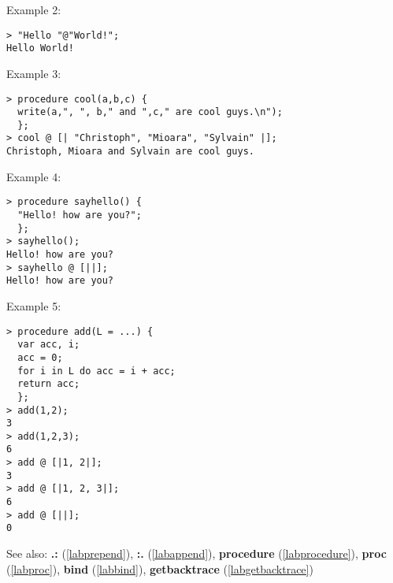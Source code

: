 \noindent Example 2: 
\begin{center}\begin{minipage}{15cm}\begin{Verbatim}[frame=single,commandchars=\\\|\~]
> "Hello "@"World!";
Hello World!
\end{Verbatim}
\end{minipage}\end{center}
\noindent Example 3: 
\begin{center}\begin{minipage}{15cm}\begin{Verbatim}[frame=single,commandchars=\\\|\~]
> procedure cool(a,b,c) { 
  write(a,", ", b," and ",c," are cool guys.\n");
  };
> cool @ [| "Christoph", "Mioara", "Sylvain" |];
Christoph, Mioara and Sylvain are cool guys.
\end{Verbatim}
\end{minipage}\end{center}
\noindent Example 4: 
\begin{center}\begin{minipage}{15cm}\begin{Verbatim}[frame=single,commandchars=\\\|\~]
> procedure sayhello() { 
  "Hello! how are you?";
  };
> sayhello();
Hello! how are you?
> sayhello @ [||];
Hello! how are you?
\end{Verbatim}
\end{minipage}\end{center}
\noindent Example 5: 
\begin{center}\begin{minipage}{15cm}\begin{Verbatim}[frame=single,commandchars=\\\|\~]
> procedure add(L = ...) {
  var acc, i;
  acc = 0;
  for i in L do acc = i + acc;
  return acc;
  };
> add(1,2);
3
> add(1,2,3);
6
> add @ [|1, 2|];
3
> add @ [|1, 2, 3|];
6
> add @ [||];
0
\end{Verbatim}
\end{minipage}\end{center}
See also: \textbf{.:} (\ref{labprepend}), \textbf{:.} (\ref{labappend}), \textbf{procedure} (\ref{labprocedure}), \textbf{proc} (\ref{labproc}), \textbf{bind} (\ref{labbind}), \textbf{getbacktrace} (\ref{labgetbacktrace})
